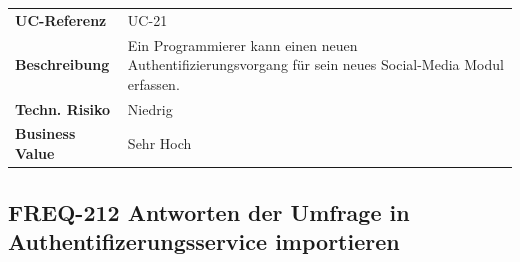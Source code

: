 \begin{longtable}[c]{@{}ll@{}}
\toprule
\begin{minipage}[t]{0.20\columnwidth}\raggedright\strut
\textbf{UC-Referenz}
\strut\end{minipage} &
\begin{minipage}[t]{0.74\columnwidth}\raggedright\strut
UC-21
\strut\end{minipage}\tabularnewline
\begin{minipage}[t]{0.20\columnwidth}\raggedright\strut
\textbf{Beschreibung}
\strut\end{minipage} &
\begin{minipage}[t]{0.74\columnwidth}\raggedright\strut
Ein Programmierer kann einen neuen Authentifizierungsvorgang für sein
neues Social-Media Modul erfassen.
\strut\end{minipage}\tabularnewline
\begin{minipage}[t]{0.20\columnwidth}\raggedright\strut
\textbf{Techn. Risiko}
\strut\end{minipage} &
\begin{minipage}[t]{0.74\columnwidth}\raggedright\strut
Niedrig
\strut\end{minipage}\tabularnewline
\begin{minipage}[t]{0.20\columnwidth}\raggedright\strut
\textbf{Business Value}
\strut\end{minipage} &
\begin{minipage}[t]{0.74\columnwidth}\raggedright\strut
Sehr Hoch
\strut\end{minipage}\tabularnewline
\bottomrule
\end{longtable}

\subsection{FREQ-212 Antworten der Umfrage in Authentifizerungsservice
importieren}\label{freq-212-antworten-der-umfrage-in-authentifizerungsservice-importieren}


